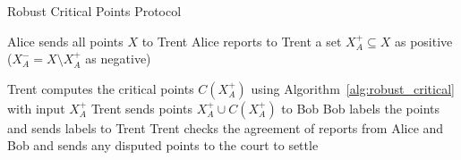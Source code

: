 \begin{algorithm2e}[htb]
\caption{Robust Critical Points Protocol}
\label{alg:robust_protocol}
\DontPrintSemicolon
\LinesNumbered


Alice sends all points $X$ to Trent\;
Alice reports to Trent a set $X_A^+ \subseteq X$ as positive ($X_A^- = X \setminus X_A^+$ as negative)\;


Trent computes the critical points $C(X_A^+)$ using Algorithm~\ref{alg:robust_critical} with input $X_A^+$\;
Trent sends points $X_A^+ \cup C(X_A^+)$ to Bob\;
Bob labels the points and sends labels to Trent\;
Trent checks the agreement of reports from Alice and Bob and sends any disputed points to the court to settle\;


\end{algorithm2e}
